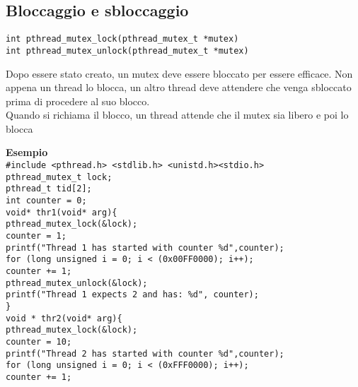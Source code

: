 \begin{flushleft}
  \subsection{Bloccaggio e sbloccaggio}
  \begin{flushleft}
    \texttt{int pthread\_mutex\_lock(pthread\_mutex\_t *mutex)\\
    int pthread\_mutex\_unlock(pthread\_mutex\_t *mutex)}
    \begin{flushleft}
      Dopo essere stato creato, un mutex deve essere bloccato per essere efficace. Non 
      appena un thread lo blocca, un altro thread deve attendere che venga sbloccato 
      prima di procedere al suo blocco.\\
      Quando si richiama il blocco, un thread attende che il mutex sia libero e poi lo blocca
    \end{flushleft}
  \end{flushleft}
  \begin{flushleft}
    \textbf{Esempio}\\
    \texttt{\#include <pthread.h> <stdlib.h> <unistd.h><stdio.h> \\
    pthread\_mutex\_t lock;\\
    pthread\_t tid[2];\\
    int counter = 0;\\
    void* thr1(void* arg)\{\\
    \halftab pthread\_mutex\_lock(\&lock);\\
    \halftab counter = 1;\\
    \halftab printf("Thread 1 has started with counter \%d\n",counter);\\
    \halftab for (long unsigned i = 0; i < (0x00FF0000); i++);\\
    \halftab counter += 1;\\
    \halftab pthread\_mutex\_unlock(\&lock);\\
    \halftab printf("Thread 1 expects 2 and has: \%d\n", counter);\\
    \} \\
    void * thr2(void* arg)\{ \\
    \halftab pthread\_mutex\_lock(\&lock);\\
    \halftab counter = 10;\\
    \halftab printf("Thread 2 has started with counter \%d\n",counter);\\
    \halftab for (long unsigned i = 0; i < (0xFFF0000); i++);\\
    \halftab counter += 1;\\
}
\end{flushleft}
\end{flushleft}
